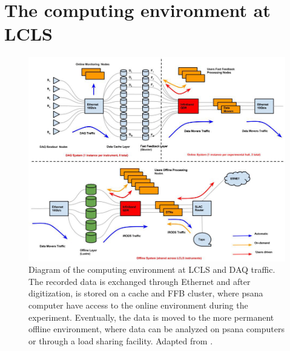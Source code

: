 \section{The computing environment at LCLS}\label{sec:LCLS-computing}
\begin{figure}
	\centering
		\includegraphics[width=1.00\textwidth]{images/daq-architecture.JPG}
	\caption[Diagram of the computing environment at LCLS and DAQ traffic.]{Diagram of the computing environment at LCLS and DAQ traffic. The recorded data is exchanged through Ethernet and after digitization, is stored on a cache and FFB cluster, where psana computer have access to the online environment during the experiment. Eventually, the data is moved to the more permanent offline environment, where data can be analyzed on psana computers or through a load sharing facility. Adapted from \citep{Amadeo-2016-SLAC}.}
	\label{fig:daq-architecture}
\end{figure}
